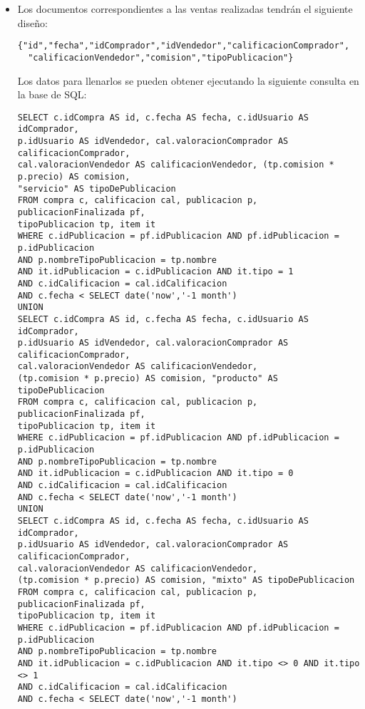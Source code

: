 \begin{itemize}
\item Los documentos correspondientes a las ventas realizadas tendr\'an el siguiente dise\~no:
\begin{verbatim}
{"id","fecha","idComprador","idVendedor","calificacionComprador",
  "calificacionVendedor","comision","tipoPublicacion"}
\end{verbatim}
Los datos para llenarlos se pueden obtener ejecutando la siguiente consulta en la base de SQL:
\begin{verbatim}
SELECT c.idCompra AS id, c.fecha AS fecha, c.idUsuario AS idComprador,
p.idUsuario AS idVendedor, cal.valoracionComprador AS calificacionComprador, 
cal.valoracionVendedor AS calificacionVendedor, (tp.comision * p.precio) AS comision, 
"servicio" AS tipoDePublicacion
FROM compra c, calificacion cal, publicacion p, publicacionFinalizada pf, 
tipoPublicacion tp, item it
WHERE c.idPublicacion = pf.idPublicacion AND pf.idPublicacion = p.idPublicacion 
AND p.nombreTipoPublicacion = tp.nombre 
AND it.idPublicacion = c.idPublicacion AND it.tipo = 1
AND c.idCalificacion = cal.idCalificacion
AND c.fecha < SELECT date('now','-1 month')
UNION
SELECT c.idCompra AS id, c.fecha AS fecha, c.idUsuario AS idComprador, 
p.idUsuario AS idVendedor, cal.valoracionComprador AS calificacionComprador, 
cal.valoracionVendedor AS calificacionVendedor, 
(tp.comision * p.precio) AS comision, "producto" AS tipoDePublicacion
FROM compra c, calificacion cal, publicacion p, publicacionFinalizada pf, 
tipoPublicacion tp, item it
WHERE c.idPublicacion = pf.idPublicacion AND pf.idPublicacion = p.idPublicacion 
AND p.nombreTipoPublicacion = tp.nombre 
AND it.idPublicacion = c.idPublicacion AND it.tipo = 0
AND c.idCalificacion = cal.idCalificacion
AND c.fecha < SELECT date('now','-1 month')
UNION
SELECT c.idCompra AS id, c.fecha AS fecha, c.idUsuario AS idComprador, 
p.idUsuario AS idVendedor, cal.valoracionComprador AS calificacionComprador, 
cal.valoracionVendedor AS calificacionVendedor, 
(tp.comision * p.precio) AS comision, "mixto" AS tipoDePublicacion
FROM compra c, calificacion cal, publicacion p, publicacionFinalizada pf, 
tipoPublicacion tp, item it
WHERE c.idPublicacion = pf.idPublicacion AND pf.idPublicacion = p.idPublicacion 
AND p.nombreTipoPublicacion = tp.nombre 
AND it.idPublicacion = c.idPublicacion AND it.tipo <> 0 AND it.tipo <> 1
AND c.idCalificacion = cal.idCalificacion
AND c.fecha < SELECT date('now','-1 month')
\end{verbatim}

\end{itemize}